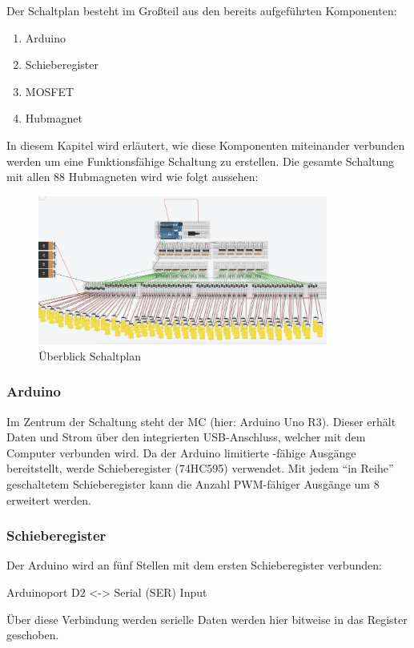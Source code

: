 Der Schaltplan besteht im Großteil aus den bereits aufgeführten Komponenten:
\begin{enumerate}
	\item Arduino
	\item Schieberegister
	\item MOSFET
	\item Hubmagnet
\end{enumerate}
In diesem Kapitel wird erläutert, wie diese Komponenten miteinander verbunden werden um eine Funktionsfähige
Schaltung zu erstellen. Die gesamte Schaltung mit allen 88 Hubmagneten wird wie folgt aussehen:
\begin{figure}[htbp]
	\centering
	\includegraphics [width=0.85\textwidth] {img/SchaltungGesamt}
	\caption{Überblick Schaltplan}
	\label{img:Schaltplan}
\end{figure}
\subsubsection{Arduino}

Im Zentrum der Schaltung steht der \ac{MC} (hier: Arduino Uno R3).
Dieser erhält Daten und Strom über den integrierten USB-Anschluss, welcher mit dem Computer verbunden wird.
Da der Arduino limitierte -fähige Ausgänge bereitstellt, werde Schieberegister (74HC595) verwendet.
Mit jedem \enquote{in Reihe} geschaltetem Schieberegister kann die Anzahl \ac{PWM}-fähiger Ausgänge um 8 erweitert werden.

\subsubsection{Schieberegister}

Der Arduino wird an fünf Stellen mit dem ersten Schieberegister verbunden:

Arduinoport D2 <-> Serial (SER) Input

Über diese Verbindung werden serielle Daten werden hier bitweise in das Register geschoben.

